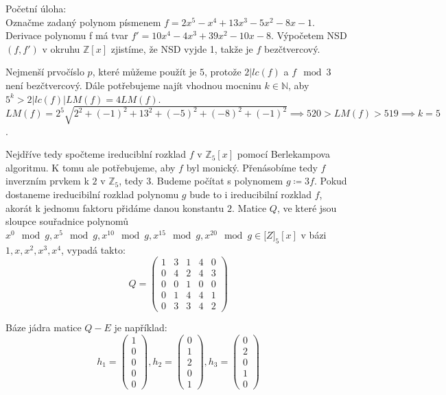 \documentclass[12pt, a4paper]{article}
\begin{document}
Početní úloha:\\

Označme zadaný polynom písmenem $f = 2 x^5 - x^4 + 13 x^3 - 5 x^2 - 8 x - 1$. Derivace polynomu f má tvar $f' = 10x^4-4x^3+39x^2-10x-8$. Výpočetem NSD$(f,f')$ v okruhu $\mathbb{Z}[x]$ zjistíme, že NSD vyjde 1, takže je $f$ bezčtvercový.

Nejmenší prvočíslo $p$, které můžeme použít je $5$, protože $2 | lc(f)$ a $f \mod 3$ není bezčtvercový. Dále potřebujeme najít vhodnou mocninu $k \in \mathbb{N}$, aby $5^k > 2|lc(f)|LM(f) = 4LM(f)$. $LM(f) = 2^5 \sqrt{2^2+(-1)^2+13^2+(-5)^2+(-8)^2+(-1)^2} \implies 520 > LM(f) > 519 \implies k=5$. 

Nejdříve tedy spočteme ireduciblní rozklad $f$ v $\mathbb{Z}_5[x]$ pomocí Berlekampova algoritmu. K tomu ale potřebujeme, aby $f$ byl monický. Přenásobíme tedy $f$ inverzním prvkem k $2$ v $\mathbb{Z}_5$, tedy $3$. Budeme počítat s polynomem $g \coloneqq 3f$. Pokud dostaneme ireducibilní rozklad polynomu $g$ bude to i ireducibilní rozklad $f$, akorát k jednomu faktoru přidáme danou konstantu $2$. Matice $Q$, ve které jsou sloupce souřadnice polynomů $x^0 \mod g, x^5 \mod g, x^{10} \mod g, x^{15} \mod g, x^{20} \mod g \in \mathbb[Z]_5[x]$ v bázi $1,x,x^2,x^3,x^4$, vypadá takto:
\[
Q = \begin{pmatrix}
1 & 3 & 1 & 4 & 0 \\
0 & 4 & 2 & 4 & 3 \\
0 & 0 & 1 & 0 & 0 \\
0 & 1 & 4 & 4 & 1 \\
0 & 3 & 3 & 4 & 2
\end{pmatrix}
\]

Báze jádra matice $Q-E$ je například:
\[
h_1 = \begin{pmatrix}
1 \\
0 \\
0 \\
0 \\
0 
\end{pmatrix},
h_2 = \begin{pmatrix}
0 \\
1 \\
2 \\
0 \\
1 
\end{pmatrix}, 
h_3 = \begin{pmatrix}
0 \\
2 \\
0 \\
1 \\
0 
\end{pmatrix}
\]
\end{document}
